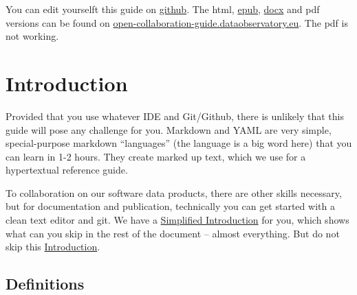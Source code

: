\documentclass[
  fontsize=13pt,
  english,
  a4paper,
  openany, a4paper, oneside]{book}
\begin{document}
You can edit yourselft this guide on \href{https://github.com/dataobservatory-eu/collaboration_guide/}{github}. The html, \href{https://open-collaboration-guide.dataobservatory.eu/reprex_collaboration_guide.docx}{epub}, \href{https://open-collaboration-guide.dataobservatory.eu/reprex_collaboration_guide.docx}{docx} and pdf versions can be found on \href{https://open-collaboration-guide.dataobservatory.eu/}{open-collaboration-guide.dataobservatory.eu}. The pdf is not working.

\hypertarget{intro}{%
\chapter{Introduction}\label{intro}}

Provided that you use whatever IDE and Git/Github, there is unlikely that this guide will pose any challenge for you. Markdown and YAML are very simple, special-purpose markdown ``languages'' (the language is a big word here) that you can learn in 1-2 hours. They create marked up text, which we use for a hypertextual reference guide.

To collaboration on our software data products, there are other skills necessary, but for documentation and publication, technically you can get started with a clean text editor and git. We have a \protect\hyperlink{simple-intro}{Simplified Introduction} for you, which shows what can you skip in the rest of the document -- almost everything. But do not skip this \protect\hyperlink{intro}{Introduction}.

\hypertarget{definitions}{%
\section{Definitions}\label{definitions}}
\end{document}

